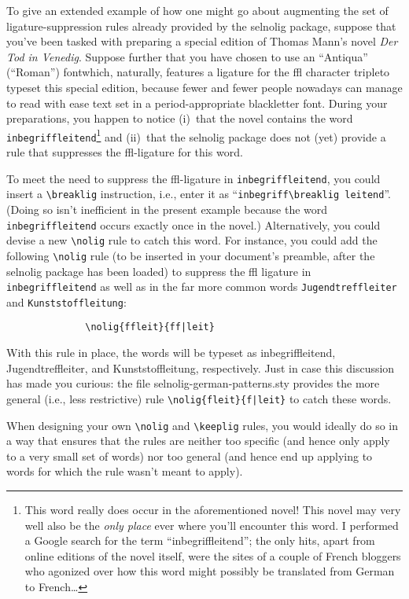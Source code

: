 \documentclass[11pt]{article}
\newcommand{\pkg}[1]{\textsf{#1}}
\newcommand{\opt}[1]{\texttt{#1}}
\newcommand{\cmmd}[1]{\texttt{\textbackslash #1}}
\begin{document}
To give an extended example of how one might go about augmenting the set of ligature-suppression rules already provided by the \pkg{selnolig} package, suppose that you've been tasked with preparing a special edition of Thomas Mann's novel \emph{Der Tod in Venedig}. Suppose further that you have chosen to use an \enquote{Antiqua} (\enquote{Roman}) font\textemdash which, naturally, features a ligature for the ffl character triple\textemdash to typeset this special edition,  because fewer and fewer people nowadays can manage to read with ease text set in a {\blackletter period-appropriate blackletter font}. During your preparations, you happen to notice (i)~that the novel contains the word \opt{inbegriffleitend}\footnote{This word really does occur in the aforementioned novel! This novel may very well also be the \emph{only place} ever where you'll encounter this word. I performed a Google search for the term \enquote{inbegriffleitend}; the only hits, apart from online editions of the novel itself, were the sites of a couple of French bloggers who agonized over how this word might possibly be translated from German to French\dots} and (ii)~that the \pkg{selnolig} package does not (yet) provide a rule that suppresses the ffl-ligature for this word. 

To meet the need to suppress the ffl-ligature in \opt{inbegriffleitend}, you could insert a \cmmd{breaklig} instruction, i.e., enter it as ``\Verb|inbegriff\breaklig leitend|''. (Doing so isn't inefficient in the present example because the word \opt{inbegriffleitend} occurs exactly once in the novel.) Alternatively, you could devise a new \cmmd{nolig} rule to catch this word. For instance, you could add the following \cmmd{nolig} rule (to be inserted in your document's preamble, after the \pkg{selnolig} package has been loaded) to suppress the ffl ligature in  \opt{inbegriffleitend} as well as in the far more common words \opt{Jugendtreffleiter} and \opt{Kunststoffleitung}:
\begin{Verbatim}
              \nolig{ffleit}{ff|leit}
\end{Verbatim}
With this rule in place, the words will be typeset as inbegriffleitend, Jugendtreffleiter, and Kunststoffleitung, respectively. Just in case this discussion has made you curious: the file \pkg{selnolig-german-patterns.sty} provides the more general (i.e., less restrictive) rule \Verb+\nolig{fleit}{f|leit}+ to catch these words.

When designing your own \cmmd{nolig} and \cmmd{keeplig} rules, you would ideally do so in a way that ensures that the rules are neither too specific (and hence only apply to a very small set of words) nor too general (and hence end up applying to words for which the rule wasn't meant to apply). 
\end{document}

